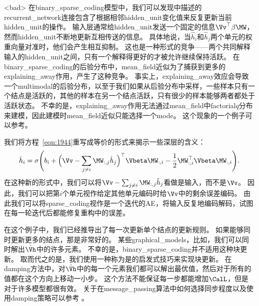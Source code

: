 <bad>
在\gls{binary_sparse_coding}模型中，我们可以发现中描述的\gls{recurrent_network}连接包含了根据相邻\gls{hidden_unit}变化值来反复更新当前\gls{hidden_unit}的操作。
输入层通常给\gls{hidden_unit}发送一个固定的信息$\Vv^{\top}\beta\MW$，然而\gls{hidden_unit}不断地更新互相传送的信息。
具体地说，当$\hat{h}_i$和$\hat{h}_j$两个单元的权重向量对准时，他们会产生相互抑制。
这也是一种形式的竞争——两个共同解释输入的\gls{hidden_unit}之间，只有一个解释得更好的才被允许继续保持活跃。
在\gls{binary_sparse_coding}的后验分布中，\gls{mean_field}近似为了捕获到更多的\gls{explaining_away}作用，产生了这种竞争。
事实上，\gls{explaining_away}效应会导致一个\gls{multimodal}的后验分布，以至于我们如果从后验分布中采样，一些样本只有一个结点是活跃的，其他的样本在另一个结点活跃，只有很少的样本能够两者都处于活跃状态。
不幸的是，\gls{explaining_away}作用无法通过\gls{mean_field}中\gls{factorial}$q$分布来建模，因此建模时\gls{mean_field}近似只能选择一个\gls{mode}。
这个现象的一个例子可以参考。




我们将方程~\eqref{eqn:1944}重写成等价的形式来揭示一些深层的含义：
\begin{align}
\hat{h}_i = \sigma\Bigg(b_i + \Big(\Vv - \sum_{j\neq i} \MW_{:,j}\hat{h}_j\Big)^{\top} {\Vbeta}\MW_{:,i} - \frac{1}{2} \MW_{:,i}^{\top} {\Vbeta} \MW_{:,i}\Bigg). 
\end{align}
在这种新的形式中，我们可以将$\Vv - \sum_{j\neq i} \MW_{:,j}\hat{h}_j$看做是输入，而不是$\Vv$。
因此，我们可以把第$i$个单元视作给定其他单元编码时给$\Vv$中的剩余误差编码。
由此我们可以将\gls{sparse_coding}视作是一个迭代的\gls{AE}，将输入反复地编码解码，试图在每一轮迭代后都能修复重构中的误差。


在这个例子中，我们已经推导出了每一次更新单个结点的更新规则。
如果能够同时更新更多的结点，那是非常好的。
某些\gls{graphical_models}，比如，我们可以同时解出$\hat{\Vh}$中的许多元素。
不幸的是，\gls{binary_sparse_coding}并不适用这种块更新。
取而代之的是，我们使用一种称为是的启发式技巧来实现块更新。
在\gls{damping}方法中，对$\hat{\Vh}$中的每一个元素我们都可以解出最优值，然后对于所有的值都在这个方向上移动一小步。
这个方法不能保证每一步都能增加$\CalL$，但是对于许多模型都很有效。
关于在\gls{message_passing}算法中如何选择同步程度以及使用\gls{damping}策略可以参考\citet{koller-book2009} 。




\subsection{}
\label{sec:calculus_of_variations}


